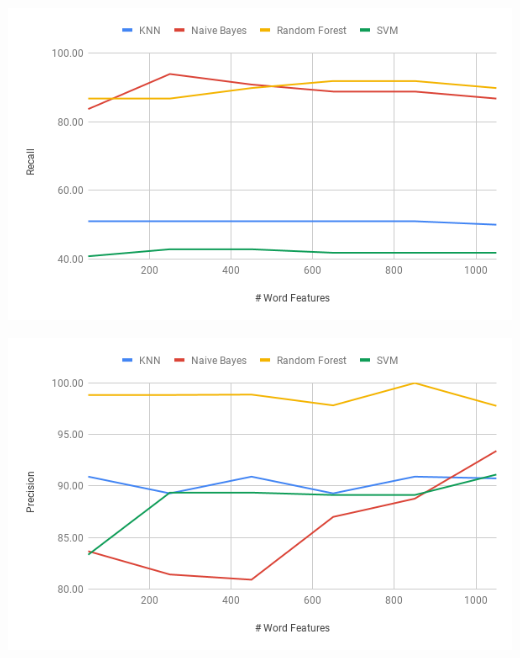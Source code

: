 \documentclass[12pt]{article}
\newenvironment{Figure}
  {\par\medskip\noindent\minipage{\linewidth}}
  {\endminipage\par\medskip}
\begin{document}
\begin{multicols}{2}
                \begin{Figure}
                    \centering
                    \includegraphics[width=\linewidth]{figures/recall_wv_effect.png}
                    \label{fig:recall_word_effect}
                \end{Figure}
            
            
            


                \begin{Figure}
                    \centering
                    \includegraphics[width=\linewidth]{figures/precision_wv_effect.png}
                    \label{fig:precision_word_effect}
                \end{Figure}


\end{multicols}
\end{document}
